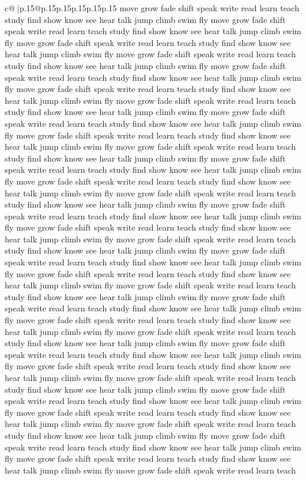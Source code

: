 \documentclass{article}
\begin{document}
{\begin{supertabular}{c@{$\;$}|p{.15\linewidth}@{}p{.15\linewidth}p{.15\linewidth}p{.15\linewidth}p{.15\linewidth}p{.15\linewidth}}
{{{move grow fade shift speak write read learn teach study find show know see hear talk jump climb swim fly move grow fade shift speak write read learn teach study find show know see hear talk jump climb swim fly move grow fade shift speak write read learn teach study find show know see hear talk jump climb swim fly move grow fade shift speak write read learn teach study find show know see hear talk jump climb swim fly move grow fade shift speak write read learn teach study find show know see hear talk jump climb swim fly move grow fade shift speak write read learn teach study find show know see hear talk jump climb swim fly move grow fade shift speak write read learn teach study find show know see hear talk jump climb swim fly move grow fade shift speak write read learn teach study find show know see hear talk jump climb swim fly move grow fade shift speak write read learn teach study find show know see hear talk jump climb swim fly move grow fade shift speak write read learn teach study find show know see hear talk jump climb swim fly move grow fade shift speak write read learn teach study find show know see hear talk jump climb swim fly move grow fade shift speak write read learn teach study find show know see hear talk jump climb swim fly move grow fade shift speak write read learn teach study find show know see hear talk jump climb swim fly move grow fade shift speak write read learn teach study find show know see hear talk jump climb swim fly move grow fade shift speak write read learn teach study find show know see hear talk jump climb swim fly move grow fade shift speak write read learn teach study find show know see hear talk jump climb swim fly move grow fade shift speak write read learn teach study find show know see hear talk jump climb swim fly move grow fade shift speak write read learn teach study find show know see hear talk jump climb swim fly move grow fade shift speak write read learn teach study find show know see hear talk jump climb swim fly move grow fade shift speak write read learn teach study find show know see hear talk jump climb swim fly move grow fade shift speak write read learn teach study find show know see hear talk jump climb swim fly move grow fade shift speak write read learn teach study find show know see hear talk jump climb swim fly move grow fade shift speak write read learn teach study find show know see hear talk jump climb swim fly move grow fade shift speak write read learn teach study find show know see hear talk jump climb swim fly move grow fade shift speak write read learn teach study find show know see hear talk jump climb swim fly move grow fade shift speak write read learn teach study find show know see hear talk jump climb swim fly move grow fade shift speak write read learn teach study find show know see hear talk jump climb swim fly move grow fade shift speak write read learn teach study find show know see hear talk jump climb swim fly move grow fade shift speak write read learn teach study find show know see hear talk jump climb swim fly move grow fade shift speak write read learn teach study find show know see hear talk jump climb swim fly move grow fade shift speak write read learn teach }}}
\end{supertabular}}
\end{document}
